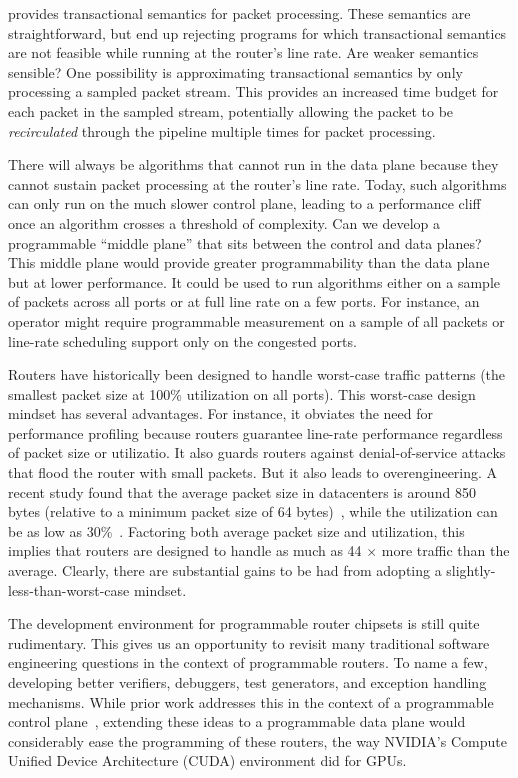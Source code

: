  \pktlanguage provides
transactional semantics for packet processing. These semantics are
straightforward, but end up rejecting programs for which transactional
semantics are not feasible while running at the router's line rate.  Are weaker
semantics sensible? One possibility is approximating transactional semantics by
only processing a sampled packet stream.  This provides an increased time
budget for each packet in the sampled stream, potentially allowing the packet
to be {\em recirculated} through the pipeline multiple times for packet
processing.

 There will always be algorithms that
cannot run in the data plane because they cannot sustain packet processing at
the router’s line rate. Today, such algorithms can only run on the much slower
control plane, leading to a performance cliff once an algorithm crosses a
threshold of complexity. Can we develop a programmable “middle plane” that sits
between the control and data planes? This middle plane would provide greater
programmability than the data plane but at lower performance. It could be used
to run algorithms either on a sample of packets across all ports or at full
line rate on a few ports. For instance, an operator might require programmable
measurement on a sample of all packets or line-rate scheduling support only on
the congested ports.

 Routers have historically been
designed to handle worst-case traffic patterns (\ie the smallest packet size at
100\% utilization on all ports). This worst-case design mindset has several
advantages. For instance, it obviates the need for performance profiling
because routers guarantee line-rate performance regardless of packet size or
utilizatio. It also guards routers against denial-of-service attacks that flood
the router with small packets. But it also leads to overengineering. A recent
study found that the average packet size in datacenters is around 850 bytes
(relative to a minimum packet size of 64 bytes)~\cite{theo_dc}, while the
utilization can be as low as 30\%~\cite{theo_dc}. Factoring both average packet
size and utilization, this implies that routers are designed to handle as much
as 44 $\times$ more traffic than the average. Clearly, there are substantial
gains to be had from adopting a slightly-less-than-worst-case mindset.

The development environment for programmable router chipsets is still quite
rudimentary. This gives us an opportunity to revisit many traditional software
engineering questions in the context of programmable routers. To name a few,
developing better verifiers, debuggers, test generators, and exception handling
mechanisms. While prior work addresses this in the context of a programmable
control plane~\cite{test_gen, hsa}, extending these ideas to a programmable
data plane would considerably ease the programming of these routers, the way
NVIDIA's Compute Unified Device Architecture (CUDA) environment did for GPUs.

